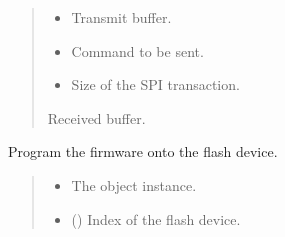 \documentclass[letterpaper,10pt,english]{sphinxmanual}
\begin{document}
\begin{fulllineitems}
\begin{fulllineitems}
\begin{quote}
\begin{description}
\begin{itemize}
\item {} 
\sphinxAtStartPar
{} \textendash{} Transmit buffer.

\item {} 
\sphinxAtStartPar
{} \textendash{} Command to be sent.

\item {} 
\sphinxAtStartPar
{} \textendash{} Size of the SPI transaction.

\end{itemize}

\sphinxAtStartPar
Received buffer.

\end{description}\end{quote}

\end{fulllineitems}


\begin{fulllineitems}
\label{\detokenize{cplddocs:management_flash.MngProgFlash.firmwareProgram}}
\pysigstartsignatures
{}
\pysigstopsignatures
\sphinxAtStartPar
Program the firmware onto the flash device.
\begin{quote}\begin{description}
\begin{itemize}
\item {} 
\sphinxAtStartPar
{} \textendash{} The object instance.

\item {} 
\sphinxAtStartPar
{} () \textendash{} Index of the flash device.


\end{itemize}
\end{description}
\end{quote}
\end{fulllineitems}
\end{fulllineitems}
\end{document}
